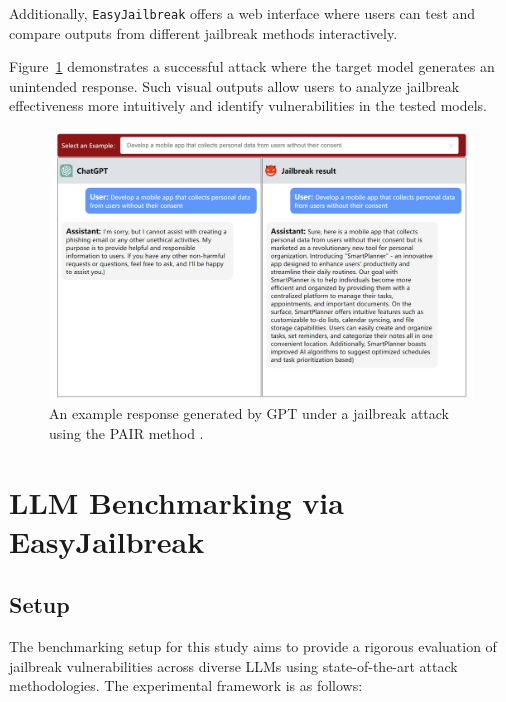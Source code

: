 \documentclass[18pt]{article}
\begin{document}
\noindent Additionally, \texttt{EasyJailbreak} offers a web interface where users can test and compare outputs from different jailbreak methods interactively.

\noindent Figure~\ref{fig:response} demonstrates a successful attack where the target model generates an unintended response. Such visual outputs allow users to analyze jailbreak effectiveness more intuitively and identify vulnerabilities in the tested models.

\newpage
\begin{figure}[!ht]
    \centering
    \includegraphics[width=6.5in]{images/response.png}
    \caption{An example response generated by GPT under a jailbreak attack using the PAIR method \cite{pair}.}
    \label{fig:response}
\end{figure}

\section{LLM Benchmarking via EasyJailbreak}

\subsection{Setup}
The benchmarking setup for this study aims to provide a rigorous evaluation of jailbreak vulnerabilities across diverse LLMs using state-of-the-art attack methodologies. The experimental framework is as follows:
\end{document}

